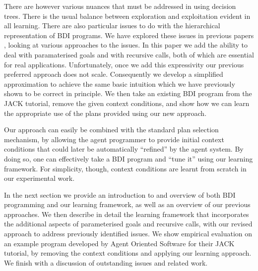 There are however various nuances that must be addressed in using
decision trees. There is the usual balance between exploration and
exploitation evident in all learning. There are also particular issues
to do with the hierarchical representation of BDI programs. 
%
We have explored these issues in previous papers
\cite{Airiau:IJAT:09,Singh:AAMAS10}, looking at various approaches to the
issues. In this paper we add the ability to deal with paramaterised
goals and with recursive calls, both of which are essential for real
applications. Unfortunately, once we add this expressivity our
previous preferred approach does not scale. Consequently we develop a
simplified approximation to achieve the same basic intuition which we
have previously shown to be correct in principle. We then take an existing BDI
program from the JACK tutorial, remove the given context conditions,
and show how we can learn the appropriate use of the plans provided
using our new approach.

Our approach can easily be combined with the standard plan selection
mechanism, by allowing the agent programmer to provide initial context conditions
that could later be automatically ``refined'' by the agent system. By doing so,
one can effectively take a BDI program and ``tune it'' using our learning
framework.
For simplicity, though, context conditions are learnt from scratch in our
experimental work.

In the next section we provide an introduction to and overview of both
BDI programming and our learning framework, as well as an overview of
our previous approaches. We then describe in detail
the learning framework that incorporates the additional aspects of
parameterised goals and recursive calls, with our revised approach to
address previously identified issues.
We show empirical evaluation on an example program developed by
Agent Oriented Software for their JACK tutorial, by removing the context
conditions and applying our learning approach.  We finish with a
discussion of outstanding issues and related work.

%
